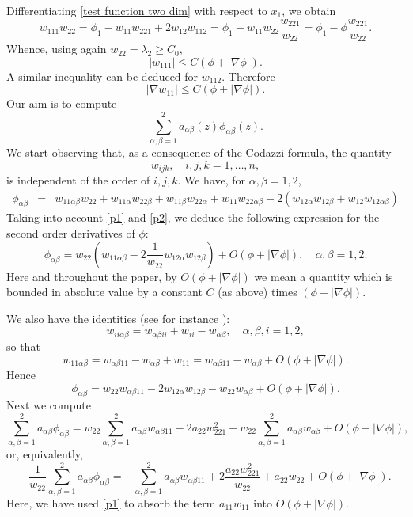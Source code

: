 \documentclass[12pt]{amsart}
\newcommand{\1}{\mathbf 1}
\begin{document}
Differentiating \eqref{test function two dim} with respect to $x_1$, we obtain
$$
w_{111}w_{22}=\phi_1-w_{11}w_{221}+2w_{12}w_{112}=\phi_1-w_{11}w_{22}\frac{w_{221}}{w_{22}}=\phi_1-\phi\frac{w_{221}}{w_{22}}.
$$
Whence, using again $w_{22}=\lambda_2\geq C_0$,
$$
|w_{111}|\le C(\phi+|\nabla\phi|).
$$
A similar inequality can be deduced for $w_{112}$. Therefore
\begin{equation}\label{p2}
|\nabla w_{11}|\le C (\phi+|\nabla \phi|).
\end{equation}
Our aim is to compute
$$
\sum_{\alpha,\beta=1}^2a_{\alpha\beta}(z)\phi_{\alpha\beta}(z).
$$
We start observing that, as a consequence of the Codazzi formula, the quantity
\begin{equation}\label{Codazzi}
w_{ijk},\quad i,j,k=1,\dots,n,
\end{equation}
is independent of the order of $i,j,k$. We have, for $\alpha,\beta=1,2$,
\begin{eqnarray*}
\phi_{\alpha\beta}&=&w_{11\alpha\beta}w_{22}+w_{11\alpha}w_{22\beta}+w_{11\beta}w_{22\alpha}+w_{11}w_{22\alpha\beta}-2(w_{12\alpha}w_{12\beta}+w_{12}w_{12\alpha\beta})
\end{eqnarray*}
Taking into account \eqref{p1} and \eqref{p2}, we deduce the following expression for the second order derivatives of $\phi$:
\begin{equation}\label{general expression}
\phi_{\alpha\beta}=w_{22}\left(w_{11\alpha\beta}-2\frac1{w_{22}}w_{12\alpha}w_{12\beta}\right)+ O(\phi+|\nabla \phi|),\quad\alpha,\beta=1,2.  
\end{equation}
Here and throughout the paper, by $O(\phi+|\nabla \phi|)$ we mean a quantity which is bounded in absolute value by a constant $C$ (as above) times  $(\phi+|\nabla \phi|)$.

We also have the identities (see for instance \cite{Guan-Ma-2003}):
\begin{equation}\label{covariant 2}
w_{ii\alpha\beta}=w_{\alpha\beta ii}+w_{ii}-w_{\alpha\beta},\quad\alpha,\beta,i=1,2,  
\end{equation}
so that
$$
w_{11\alpha\beta}=w_{\alpha\beta11}-w_{\alpha\beta}+w_{11}=w_{\alpha\beta11}-w_{\alpha\beta}+O(\phi+|\nabla \phi|).
$$
Hence
$$
\phi_{\alpha\beta}= w_{22}w_{\alpha\beta11}-2w_{12\alpha}w_{12\beta}-w_{22}w_{\alpha\beta}+O (\phi+|\nabla \phi|).
$$
Next we compute
$$
\sum_{\alpha,\beta=1}^2a_{\alpha\beta}\phi_{\alpha\beta}= w_{22}\sum_{\alpha,\beta=1}^2a_{\alpha\beta}w_{\alpha\beta11}-2a_{22}w_{221}^2-w_{22}\sum_{\alpha,\beta=1}^2a_{\alpha\beta}w_{\alpha\beta}+O(\phi+|\nabla \phi|),
$$
or, equivalently,
\begin{equation}\label{formula}
-\frac1{w_{22}}\sum_{\alpha,\beta=1}^2a_{\alpha\beta}\phi_{\alpha\beta}=-\sum_{\alpha,\beta=1}^2a_{\alpha\beta}w_{\alpha\beta11}+2\frac{a_{22}w_{221}^2}{w_{22}}+a_{22}w_{22}+O(\phi+|\nabla \phi|).
\end{equation}
Here, we have used \eqref{p1} to absorb the term $a_{11}w_{11}$ into $O(\phi+|\nabla \phi|)$.
\end{document}
